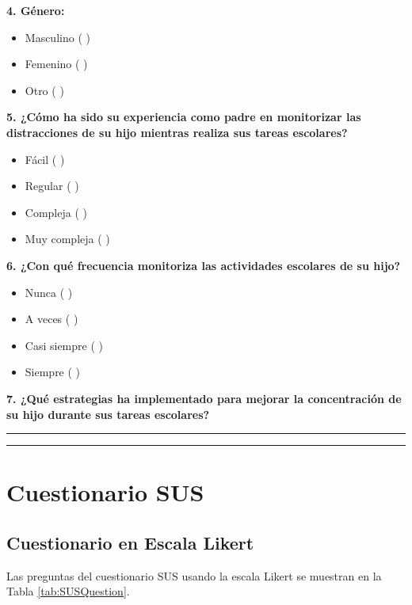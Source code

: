 \documentclass[a4paper,fleqn]{cas-sc}
\begin{document}
	\noindent
	\textbf{4. Género:}
	
	\begin{itemize}
		\item Masculino ( )
		\item Femenino ( )
		\item Otro ( )
	\end{itemize}
	
	\noindent
	\textbf{5. ¿Cómo ha sido su experiencia como padre en monitorizar las distracciones de su hijo mientras realiza sus tareas escolares?}
	
	\begin{itemize}
		\item Fácil ( )
		\item Regular ( )
		\item Compleja ( )
		\item Muy compleja ( )
	\end{itemize}
	
	\noindent
	\textbf{6. ¿Con qué frecuencia monitoriza las actividades escolares de su hijo?}
	
	\begin{itemize}
		\item Nunca ( )
		\item A veces ( )
		\item Casi siempre ( )
		\item Siempre ( )
	\end{itemize}
	
	\noindent
	\textbf{7. ¿Qué estrategias ha implementado para mejorar la concentración de su hijo durante sus tareas escolares?}
	
	\vspace{12pt}
	\noindent
	\rule{\textwidth}{1pt}
	
	\vspace{12pt}
	\noindent
	\rule{\textwidth}{1pt}
	
	\clearpage
	\section[\appendixname~\thesection]{Cuestionario SUS}
	\label{Appendix:SUSQuestionarie}
	
	
	\subsection[\appendixname~\thesection]{Cuestionario en Escala Likert}
	\label{Appendix:LikertScale}
	Las preguntas del cuestionario SUS usando la escala Likert se muestran en la Tabla \ref{tab:SUSQuestion}.
	
\end{document}
